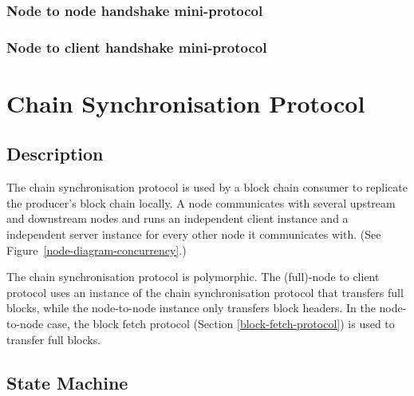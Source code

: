 \subsubsection{Node to node handshake mini-protocol}

\subsubsection{Node to client handshake mini-protocol}



\section{Chain Synchronisation Protocol}
\label{chain-sync-protocol}
\newcommand{\CanAwait}{\state{CanAwait}}
\newcommand{\MustReply}{\state{MustReply}}
\newcommand{\Intersect}{\state{Intersect}}
\newcommand{\RequestNext}{\msg{RequestNext}}
\newcommand{\AwaitReply}{\msg{AwaitReply}}
\newcommand{\RollForward}{\msg{RollForward}}
\newcommand{\RollBackward}{\msg{RollBackward}}
\newcommand{\FindIntersect}{\msg{FindIntersect}}
\newcommand{\IntersectFound}{\msg{IntersectFound}}
\newcommand{\IntersectNotFound}{\msg{IntersectNotFound}}

\subsection{Description}
The chain synchronisation protocol is used by a block chain consumer
to replicate the producer's block chain locally.
A node communicates with several upstream and downstream nodes
and runs an independent client instance and a independent server instance for every
other node it communicates with.
(See Figure~\ref{node-diagram-concurrency}.)

The chain synchronisation protocol is polymorphic.
The (full)-node to client protocol uses an instance of the chain synchronisation protocol
that transfers full blocks, while the node-to-node instance only transfers block headers.
In the node-to-node case, the block fetch protocol (Section \ref{block-fetch-protocol})
is used to transfer full blocks.

\subsection{State Machine}

